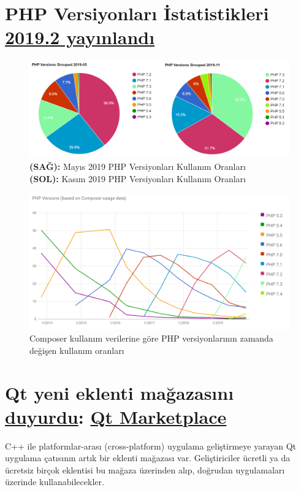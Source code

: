 \documentclass[11pt]{article}
\begin{document}
\section{PHP Versiyonları İstatistikleri \href{https://blog.packagist.com/php-versions-stats-2019-2-edition/}{2019.2 yayınlandı}}
\label{sec:org04042b4}
\begin{figure}[htbp]
\centering
\includegraphics[width=.9\linewidth]{gorseller/php-versiyon-1.png}
\caption[\textbf{(SOL):}]{\textbf{(SAĞ):} Mayıs 2019 PHP Versiyonları Kullanım Oranları \\
 \textbf{(SOL):} Kasım 2019 PHP Versiyonları Kullanım Oranları}
\end{figure}

\begin{figure}[htbp]
\centering
\includegraphics[width=.9\linewidth]{gorseller/php-versiyon-2.png}
\caption{Composer kullanım verilerine göre PHP versiyonlarının zamanda değişen kullanım	oranları}
\end{figure}

\newpage
\section{Qt yeni eklenti mağazasını \href{https://www.qt.io/blog/qt-marketplace}{duyurdu}: \href{https://marketplace.qt.io/}{Qt Marketplace}}
\label{sec:org30b1f9c}
C++ ile platformlar-arası (cross-platform) uygulama geliştirmeye yarayan Qt
uygulama çatısının artık bir eklenti mağazası var. Geliştiriciler ücretli ya da
ücretsiz birçok eklentisi bu mağaza üzerinden alıp, doğrudan uygulamaları
üzerinde kullanabilecekler.
\end{document}
